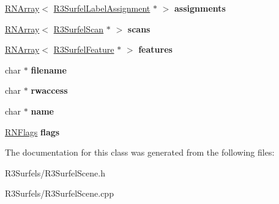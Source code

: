 \begin{DoxyCompactItemize}
\item 
\hyperlink{class_r_n_array}{R\+N\+Array}$<$ \hyperlink{class_r3_surfel_label_assignment}{R3\+Surfel\+Label\+Assignment} $\ast$ $>$ {\bfseries assignments}\hypertarget{class_r3_surfel_scene_a87c3608417a9381fd4cae245b878f25d}{}\label{class_r3_surfel_scene_a87c3608417a9381fd4cae245b878f25d}

\item 
\hyperlink{class_r_n_array}{R\+N\+Array}$<$ \hyperlink{class_r3_surfel_scan}{R3\+Surfel\+Scan} $\ast$ $>$ {\bfseries scans}\hypertarget{class_r3_surfel_scene_a17d62b9224b04f92428c8935f7904666}{}\label{class_r3_surfel_scene_a17d62b9224b04f92428c8935f7904666}

\item 
\hyperlink{class_r_n_array}{R\+N\+Array}$<$ \hyperlink{class_r3_surfel_feature}{R3\+Surfel\+Feature} $\ast$ $>$ {\bfseries features}\hypertarget{class_r3_surfel_scene_a85c19d4648e09d32568e35ed88d37f1b}{}\label{class_r3_surfel_scene_a85c19d4648e09d32568e35ed88d37f1b}

\item 
char $\ast$ {\bfseries filename}\hypertarget{class_r3_surfel_scene_ae85c94d0ff079c74599701a96ddeb4da}{}\label{class_r3_surfel_scene_ae85c94d0ff079c74599701a96ddeb4da}

\item 
char $\ast$ {\bfseries rwaccess}\hypertarget{class_r3_surfel_scene_a97987af0f79351237dd3211a0ac6a45d}{}\label{class_r3_surfel_scene_a97987af0f79351237dd3211a0ac6a45d}

\item 
char $\ast$ {\bfseries name}\hypertarget{class_r3_surfel_scene_a90d9969bbc2778a9aa2bc25dc792a757}{}\label{class_r3_surfel_scene_a90d9969bbc2778a9aa2bc25dc792a757}

\item 
\hyperlink{class_r_n_flags}{R\+N\+Flags} {\bfseries flags}\hypertarget{class_r3_surfel_scene_af94ebe6da866df3af411ad39f8bfb46a}{}\label{class_r3_surfel_scene_af94ebe6da866df3af411ad39f8bfb46a}

\end{DoxyCompactItemize}


The documentation for this class was generated from the following files\+:\begin{DoxyCompactItemize}
\item 
R3\+Surfels/R3\+Surfel\+Scene.\+h\item 
R3\+Surfels/R3\+Surfel\+Scene.\+cpp\end{DoxyCompactItemize}
